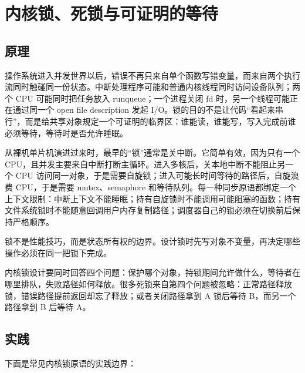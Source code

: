 \chapter{内核锁、死锁与可证明的等待}

\section{原理}

操作系统进入并发世界以后，错误不再只来自单个函数写错变量，而来自两个执行流同时触碰同一份状态。中断处理程序可能和普通内核线程同时访问设备队列；两个 CPU 可能同时把任务放入 runqueue；一个进程关闭 fd 时，另一个线程可能正在通过同一个 open file description 发起 I/O。锁的目的不是让代码“看起来串行”，而是给共享对象规定一个可证明的临界区：谁能读，谁能写，写入完成前谁必须等待，等待时是否允许睡眠。

从裸机单片机演进过来时，最早的“锁”通常是关中断。它简单有效，因为只有一个 CPU，且并发主要来自中断打断主循环。进入多核后，关本地中断不能阻止另一个 CPU 访问同一对象，于是需要自旋锁；进入可能长时间等待的路径后，自旋浪费 CPU，于是需要 mutex、semaphore 和等待队列。每一种同步原语都绑定一个上下文限制：中断上下文不能睡眠；持有自旋锁时不能调用可能阻塞的函数；持有文件系统锁时不能随意回调用户内存复制路径；调度器自己的锁必须在切换前后保持严格顺序。

\begin{keyidea}
锁不是性能技巧，而是状态所有权的边界。设计锁时先写对象不变量，再决定哪些操作必须在同一把锁下完成。
\end{keyidea}

内核锁设计要同时回答四个问题：保护哪个对象，持锁期间允许做什么，等待者在哪里排队，失败路径如何释放。很多死锁来自第四个问题被忽略：正常路径释放锁，错误路径提前返回却忘了释放；或者关闭路径拿到 A 锁后等待 B，而另一个路径拿到 B 后等待 A。

\section{实践}

下面是常见内核锁原语的实践边界：

